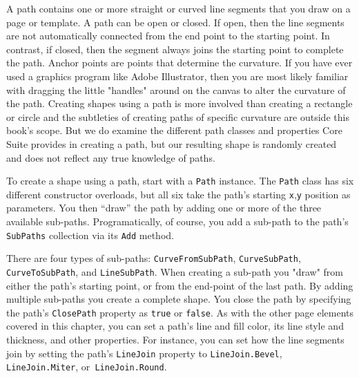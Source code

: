 \documentclass[american]{tufte-book}
\numberwithin{equation}{section}
\numberwithin{figure}{section}
\begin{document}
{{A path contains one or more straight or curved line segments that
you draw on a page or template. A path can be open or closed. If open,
then the line segments are not automatically connected from the end
point to the starting point. In contrast, if closed, then the segment
always joins the starting point to complete the path. Anchor points
are points that determine the curvature. If you have ever used a graphics
program like Adobe Illustrator, then you are most likely familiar
with dragging the little "handles" around on the canvas to alter
the curvature of the path. Creating shapes using a path is more involved
than creating a rectangle or circle and the subtleties of creating
paths of specific curvature are outside this book's scope. But we
do examine the different path classes and properties Core Suite provides
in creating a path, but our resulting shape is randomly created and
does not reflect any true knowledge of paths.

To create a shape using a path, start with a \texttt{Path} instance.
The \texttt{Path} class has six different constructor overloads, but
all six take the path's starting \texttt{x},\texttt{y} position as
parameters. You then ``draw'' the path by adding one or more of
the three available sub-paths. Programatically, of course, you add
a sub-path to the path's \texttt{SubPaths} collection via its \texttt{Add}
method. 

There are four types of sub-paths: \texttt{CurveFromSubPath}, \texttt{CurveSubPath},
\texttt{CurveToSubPath}, and \texttt{LineSubPath}. When creating a
sub-path you "draw" from either the path's starting point, or
from the end-point of the last path. By adding multiple sub-paths
you create a complete shape. You close the path by specifying the
path's \texttt{ClosePath} property as \texttt{true} or \texttt{false}. As with the other
page elements covered in this chapter, you can set a path's line and
fill color, its line style and thickness, and other properties. For
instance, you can set how the line segments join by setting the path's
\texttt{LineJoin} property to \texttt{LineJoin.Bevel}, \texttt{LineJoin.Miter},
or\texttt{ LineJoin.Round}.

}}
\end{document}
